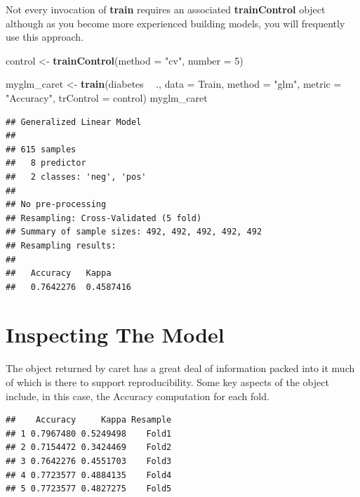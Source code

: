 \documentclass[
]{book}
\newenvironment{Shaded}{\begin{snugshade}}{\end{snugshade}}
\newcommand{\DataTypeTok}[1]{\textcolor[rgb]{0.13,0.29,0.53}{#1}}
\newcommand{\DecValTok}[1]{\textcolor[rgb]{0.00,0.00,0.81}{#1}}
\newcommand{\KeywordTok}[1]{\textcolor[rgb]{0.13,0.29,0.53}{\textbf{#1}}}
\newcommand{\NormalTok}[1]{#1}
\newcommand{\OperatorTok}[1]{\textcolor[rgb]{0.81,0.36,0.00}{\textbf{#1}}}
\newcommand{\StringTok}[1]{\textcolor[rgb]{0.31,0.60,0.02}{#1}}
\begin{document}
Not every invocation of \textbf{train} requires an associated \textbf{trainControl} object although as you become more experienced building models, you will frequently use this approach.

\begin{Shaded}
\begin{Highlighting}[]
\NormalTok{control <-}\StringTok{ }\KeywordTok{trainControl}\NormalTok{(}\DataTypeTok{method =} \StringTok{"cv"}\NormalTok{, }\DataTypeTok{number =} \DecValTok{5}\NormalTok{)}

\NormalTok{myglm_caret <-}\StringTok{ }\KeywordTok{train}\NormalTok{(diabetes }\OperatorTok{~}\StringTok{ }\NormalTok{.,}
                     \DataTypeTok{data =}\NormalTok{ Train,}
                     \DataTypeTok{method =} \StringTok{"glm"}\NormalTok{,}
                     \DataTypeTok{metric =} \StringTok{"Accuracy"}\NormalTok{,}
                     \DataTypeTok{trControl =}\NormalTok{ control)}
\NormalTok{myglm_caret}
\end{Highlighting}
\end{Shaded}

\begin{verbatim}
## Generalized Linear Model 
## 
## 615 samples
##   8 predictor
##   2 classes: 'neg', 'pos' 
## 
## No pre-processing
## Resampling: Cross-Validated (5 fold) 
## Summary of sample sizes: 492, 492, 492, 492, 492 
## Resampling results:
## 
##   Accuracy   Kappa    
##   0.7642276  0.4587416
\end{verbatim}

\hypertarget{inspecting-the-model}{%
\section{Inspecting The Model}\label{inspecting-the-model}}

The object returned by caret has a great deal of information packed into it much of which is there to support reproducibility. Some key aspects of the object include, in this case, the Accuracy computation for each fold.

\begin{Shaded}
\end{Shaded}

\begin{verbatim}
##    Accuracy     Kappa Resample
## 1 0.7967480 0.5249498    Fold1
## 2 0.7154472 0.3424469    Fold2
## 3 0.7642276 0.4551703    Fold3
## 4 0.7723577 0.4884135    Fold4
## 5 0.7723577 0.4827275    Fold5
\end{verbatim}
\end{document}
